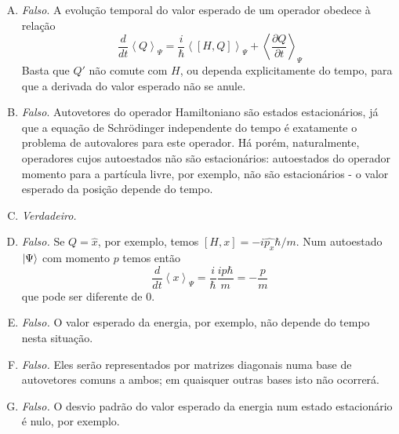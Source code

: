 \documentclass[a4paper, 12pt, notitlepage]{article}
\begin{document}
\begin{enumerate}
\begin{enumerate}[(A)]
  \item \textit{Falso}. A evolução temporal do valor esperado de um operador obedece à relação
  \[ \frac{d}{dt} \left\langle Q \right\rangle_\Psi = \frac{i}{\hbar}\left\langle [H, Q]\right\rangle_\Psi + \left\langle \frac{\partial Q}{\partial t}\right\rangle_\Psi\]
  Basta que $Q'$ não comute com $H$, ou dependa explicitamente do tempo, para que a derivada do valor esperado não se anule.
  \item \textit{Falso}. Autovetores do operador Hamiltoniano são estados estacionários, já que a equação de Schrödinger independente do tempo é exatamente o problema de autovalores para este operador. Há porém, naturalmente, operadores cujos autoestados não são estacionários: autoestados do operador momento para a partícula livre, por exemplo, não são estacionários - o valor esperado da posição depende do tempo.
  \item \textit{Verdadeiro.}
  \item \textit{Falso.} Se $Q = \hat{x}$, por exemplo, temos $[H, x] = -i\hat{p_x}\hbar/m$. Num autoestado $\ket{\Psi}$ com momento $p$ temos então
  \[ \frac{d}{dt} \left\langle x \right\rangle_\Psi = \frac{i}{\hbar} \frac{ip\hbar}{m} = -\frac{p}{m} \]
  \noindent que pode ser diferente de $0$. 
  \item \textit{Falso.} O valor esperado da energia, por exemplo, não depende do tempo nesta situação.
  \item \textit{Falso.} Eles serão representados por matrizes diagonais numa base de autovetores comuns a ambos; em quaisquer outras bases isto não ocorrerá.
  \item \textit{Falso.} O desvio padrão do valor esperado da energia num estado estacionário é nulo, por exemplo.
  
\end{enumerate}

\end{enumerate}
\end{document}
